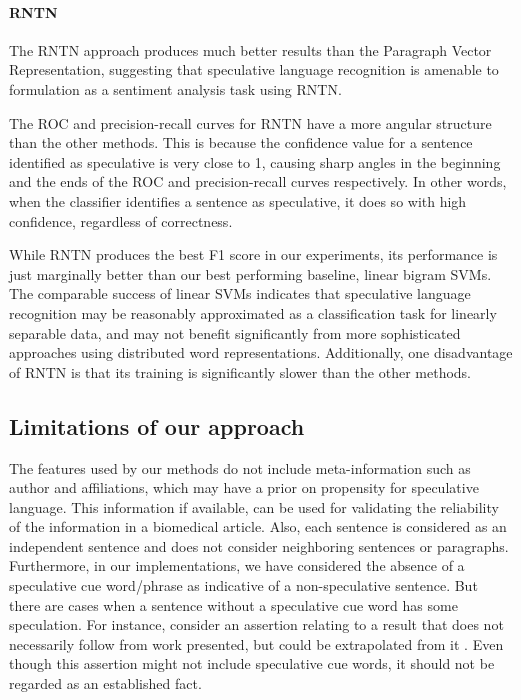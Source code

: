 \documentclass{article}
\begin{document}
\paragraph{RNTN} The RNTN approach produces much better results than the Paragraph Vector Representation, suggesting that speculative language recognition is amenable to formulation as a sentiment analysis task using RNTN.

The ROC and precision-recall curves for RNTN have a more angular structure than the other methods. This is because the confidence value for a sentence identified as speculative is very close to 1, causing sharp angles in the beginning and the ends of the ROC and precision-recall curves respectively. In other words, when the classifier identifies a sentence as speculative, it does so with high confidence,  regardless of correctness.

While RNTN produces the best F1 score in our experiments, its performance is just marginally better than our best performing baseline, linear bigram SVMs. The comparable success of linear SVMs indicates that  speculative language recognition may be reasonably approximated as a classification task for linearly separable data, and may not benefit significantly from more sophisticated approaches using distributed word representations. Additionally, one disadvantage of RNTN is that its training is significantly slower than the other methods.

\subsection*{Limitations of our approach} 
The features used by our methods do not include meta-information such as author and affiliations, which may have a prior on propensity for speculative language. This information if available, can be used for validating the reliability of the information in a biomedical article. Also, each sentence is considered as an independent sentence and does not consider neighboring sentences or paragraphs. Furthermore, in our implementations, we have considered the absence of a speculative cue word/phrase as indicative of a non-speculative sentence. But there are cases when a sentence without a speculative cue word has some speculation. For instance, consider an assertion relating to a result that does not necessarily follow from work presented, but could be extrapolated from it \autocite{Light2004}. Even though this assertion might not include speculative cue words, it should not be regarded as an established fact.
\end{document}
